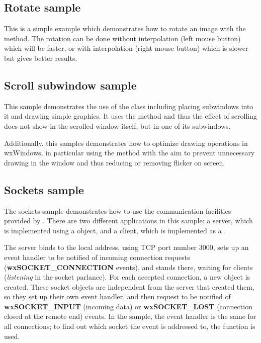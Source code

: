 \subsection{Rotate sample}\label{samplerotate}

This is a simple example which demonstrates how to rotate an image with
the  method. The rotation can
be done without interpolation (left mouse button) which will be faster,
or with interpolation (right mouse button) which is slower but gives
better results.

\subsection{Scroll subwindow sample}\label{samplescrollsub}

This sample demonstrates the use of the  
class including placing subwindows into it and drawing simple graphics. It uses the 
 method and thus the effect
of scrolling does not show in the scrolled window itself, but in one of its subwindows.

Additionally, this samples demonstrates how to optimize drawing operations in wxWindows,
in particular using the  method with 
the aim to prevent unnecessary drawing in the window and thus reducing or removing 
flicker on screen.

\subsection{Sockets sample}\label{samplesockets}

The sockets sample demonstrates how to use the communication facilities
provided by . There are two different
applications in this sample: a server, which is implemented using a 
 object, and a client, which
is implemented as a .

The server binds to the local address, using TCP port number 3000,
sets up an event handler to be notified of incoming connection requests
({\bf wxSOCKET\_CONNECTION} events), and stands there, waiting for clients
({\it listening} in the socket parlance). For each accepted connection,
a new  object is created. These
socket objects are independent from the server that created them, so
they set up their own event handler, and then request to be notified
of {\bf wxSOCKET\_INPUT} (incoming data) or {\bf wxSOCKET\_LOST} 
(connection closed at the remote end) events. In the sample, the event
handler is the same for all connections; to find out which socket the
event is addressed to, the  function
is used.

